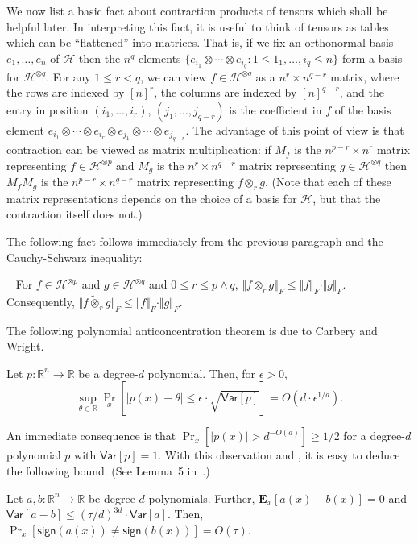 \documentclass{toc}
\begin{document}
We now list a basic fact about contraction products of tensors which shall be
helpful later. In interpreting this fact, it is useful to think of tensors as
tables which can be ``flattened'' into matrices. That is, if we fix an
orthonormal basis $e_1, \dots, e_n$ of $\mathcal{H}$ then the $n^q$ elements
$\{e_{i_1} \otimes \cdots \otimes e_{i_q}: 1 \le 1_1, \dots, i_q \le n\}$ form
a basis for $\mathcal{H}^{\otimes q}$. For any $1 \le r < q$, we can view $f
\in \mathcal{H}^{\otimes q}$ as a $n^r \times n^{q-r}$ matrix, where the rows
are indexed by $[n]^r$, the columns are indexed by $[n]^{q-r}$, and the entry
in position $(i_1, \dots, i_r)$, $(j_1, \dots, j_{q-r})$ is the coefficient in
$f$ of the basis element $e_{i_1} \otimes \cdots \otimes e_{i_r} \otimes
e_{j_1} \otimes \cdots \otimes e_{j_{q-r}}$.  The advantage of this point of
view is that contraction can be viewed as matrix multiplication: if $M_f$ is
the $n^{p - r} \times n^r$ matrix representing $f \in \mathcal{H}^{\otimes p}$ and
$M_g$ is the $n^r \times n^{q-r}$ matrix representing $g \in \mathcal{H}^{\otimes
q}$ then $M_f M_g$ is the $n^{p - r} \times n^{q - r}$ matrix representing $f
\otimes_r g$.  (Note that each of these matrix representations depends on the
choice of a basis for $\mathcal{H}$, but that the contraction itself does not.)

The following fact follows immediately from the previous paragraph and the
Cauchy-Schwarz inequality:
\begin{fact}~\label{fact:contraction}
For $f \in \mathcal{H}^{\otimes p}$ and $g \in \mathcal{H}^{\otimes q}$ and $0 \le r \le p \wedge q$, $\Vert f \otimes_r g \Vert_F \le \Vert f \Vert_F \cdot \Vert g \Vert_F$. Consequently, $\Vert f \widetilde{\otimes}_r g \Vert_F \le \Vert f \Vert_F \cdot \Vert g \Vert_F$. 
\end{fact}

%
%
%
%
%
%
%

The following polynomial anticoncentration theorem is due to Carbery and Wright. 
\begin{theorem}\emph{\cite{CW:01}}\label{thm:CW}
Let $p: \mathbb{R}^n \rightarrow \mathbb{R}$ be a degree-$d$ polynomial.  Then, for $\epsilon>0$, 
$$
\sup_{\theta \in \mathbb{R}} \Pr_{x} [|p(x) -\theta| \le \epsilon \cdot \sqrt{\mathsf{Var}[p]}] = O(d \cdot \epsilon^{1/d}). 
$$
\end{theorem}
An immediate consequence is that $\Pr_{x} [|p(x)| > d^{-O(d)}] \ge {1}/{2}$ for a degree-$d$
polynomial $p$ with $\mathsf{Var}[p] = 1$. With this observation and ,
it is easy to deduce the following bound. (See Lemma~5 in~\cite{DS14}.)
\begin{theorem}\label{thm:combine-hyper}
Let $a, b: \mathbb{R}^n \rightarrow \mathbb{R}$ be degree-$d$ polynomials. Further, $\mathbf{E}_x [a(x) - b(x)]=0$ and $\mathsf{Var}[a-b] \le (\tau/d)^{3d} \cdot \mathsf{Var}[a]$. Then, $\Pr_{x}[\mathsf{sign}(a(x)) \neq  \mathsf{sign}(b(x))] = O(\tau)$. 
\end{theorem}
\end{document}
